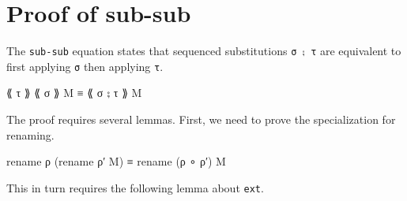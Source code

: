 \hypertarget{proof-of-sub-sub}{%
\section{Proof of sub-sub}\label{proof-of-sub-sub}}

The \texttt{sub-sub} equation states that sequenced substitutions
\texttt{σ\ ⨟\ τ} are equivalent to first applying \texttt{σ} then
applying \texttt{τ}.

\begin{myDisplay}
⟪ τ ⟫ ⟪ σ ⟫ M  ≡ ⟪ σ ⨟ τ ⟫ M
\end{myDisplay}

The proof requires several lemmas. First, we need to prove the
specialization for renaming.

\begin{myDisplay}
rename ρ (rename ρ′ M) ≡ rename (ρ ∘ ρ′) M
\end{myDisplay}

This in turn requires the following lemma about \texttt{ext}.

